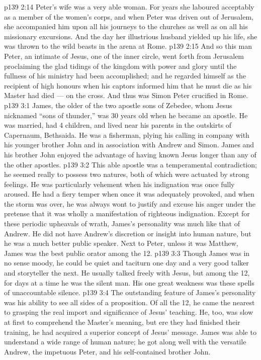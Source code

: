 \vs p139 2:14 \pc Peter’s wife was a very able woman. For years she laboured acceptably as a member of the women’s corps, and when Peter was driven out of Jerusalem, she accompanied him upon all his journeys to the churches as well as on all his missionary excursions. And the day her illustrious husband yielded up his life, she was thrown to the wild beasts in the arena at Rome.
\vs p139 2:15 \pc And so this man Peter, an intimate of Jesus, one of the inner circle, went forth from Jerusalem proclaiming the glad tidings of the kingdom with power and glory until the fullness of his ministry had been accomplished; and he regarded himself as the recipient of high honours when his captors informed him that he must die as his Master had died --- on the cross. And thus was Simon Peter crucified in Rome.
\vs p139 3:1 James, the older of the two apostle sons of Zebedee, whom Jesus nicknamed “sons of thunder,” was 30 years old when he became an apostle. He was married, had 4 children, and lived near his parents in the outskirts of Capernaum, Bethsaida. He was a fisherman, plying his calling in company with his younger brother John and in association with Andrew and Simon. James and his brother John enjoyed the advantage of having known Jesus longer than any of the other apostles.
\vs p139 3:2 \pc This able apostle was a temperamental contradiction; he seemed really to possess two natures, both of which were actuated by strong feelings. He was particularly vehement when his indignation was once fully aroused. He had a fiery temper when once it was adequately provoked, and when the storm was over, he was always wont to justify and excuse his anger under the pretense that it was wholly a manifestation of righteous indignation. Except for these periodic upheavals of wrath, James’s personality was much like that of Andrew. He did not have Andrew’s discretion or insight into human nature, but he was a much better public speaker. Next to Peter, unless it was Matthew, James was the best public orator among the 12.
\vs p139 3:3 Though James was in no sense moody, he could be quiet and taciturn one day and a very good talker and storyteller the next. He usually talked freely with Jesus, but among the 12, for days at a time he was the silent man. His one great weakness was these spells of unaccountable silence.
\vs p139 3:4 The outstanding feature of James’s personality was his ability to see all sides of a proposition. Of all the 12, he came the nearest to grasping the real import and significance of Jesus’ teaching. He, too, was slow at first to comprehend the Master’s meaning, but ere they had finished their training, he had acquired a superior concept of Jesus’ message. James was able to understand a wide range of human nature; he got along well with the versatile Andrew, the impetuous Peter, and his self\hyp{}contained brother John.

